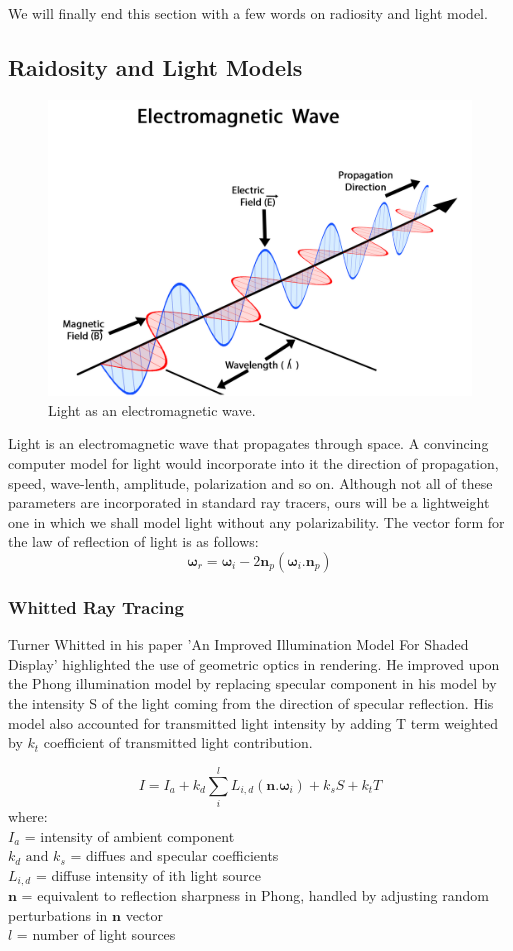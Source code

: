 \documentclass[a4paper, 12pt]{article}
\begin{document}
	We will finally end this section with a few words 
	on radiosity and light model.

\subsection{Raidosity and Light Models}
\begin{center}
\begin{figure}
	\includegraphics[width=0.6\linewidth, scale=0.8]{lightem.png}
	\centering
	\caption{Light as an electromagnetic wave.}
\end{figure}
\end{center}
Light is an electromagnetic wave that propagates through space. 
A convincing computer model for light would incorporate into it 
the direction of propagation, speed, wave-lenth, amplitude, polarization 
and so on. Although not all of these parameters are incorporated in 
standard ray tracers, ours will be a lightweight one in which we 
shall model light without any polarizability.
The vector form for the law of reflection of light is as follows: 
$$
\bm{\omega}_{r}=\bm{\omega}_{i}-2\bm{n}_{p}(\bm{\omega}_{i}.\bm{n}_{p})
$$

\subsubsection{Whitted Ray Tracing}
Turner Whitted in his paper 'An Improved Illumination Model
For Shaded Display'\cite{whitted} highlighted the use of 
geometric optics in rendering. He improved upon the Phong 
illumination model\cite{Phong1975IlluminationFC} by replacing specular component
in his model by the intensity S of the light coming from the direction of 
specular reflection. His model also accounted for 
transmitted light intensity by adding T term weighted by $k_{t}$ coefficient 
of transmitted light contribution.

\begin{equation}\label{eqn:whittedmodel}
I = I_{a} + k_{d}\sum_{i}^{l}L_{i,d}(\bm{n}.\bm{\omega}_{i}) + k_{s}S + k_{t}T
\end{equation}
where: \\
$I_{a}$ = intensity of ambient component \\
$k_{d}\text{ and } k_{s}$ = diffues and specular coefficients \\ 
$L_{i,d}$ = diffuse intensity of ith light source \\
$\bm{n}$ = equivalent to reflection sharpness in Phong\cite{Phong1975IlluminationFC},
handled by adjusting random perturbations in $\bm{n}$ vector \\
$l$ = number of light sources
\end{document}
